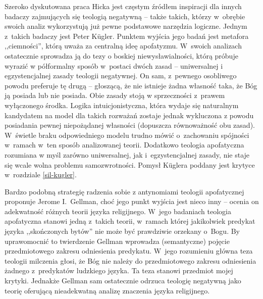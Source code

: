 Szeroko dyskutowana praca Hicka jest częstym źródłem inspiracji dla innych badaczy zajmujących się teologią negatywną -- także takich, którzy w~obrębie swoich analiz wykorzystują już pewne podstawowe narzędzia logiczne. Jednym z~takich badaczy jest Peter Kügler.
Punktem wyjścia jego badań jest metafora ,,ciemności'', którą uważa za centralną ideę apofatyzmu. W~swoich analizach ostatecznie sprowadza ją do tezy o boskiej niewysławialności, którą próbuje wyrazić w półformalny sposób w~postaci dwóch zasad -- uniwersalnej i egzystencjalnej zasady teologii negatywnej. On sam, z~pewnego osobliwego powodu preferuje tę drugą -- głoszącą, że nie istnieje żadna własność
taka, że Bóg ją posiada lub nie posiada.
Obie zasady stoją w sprzeczności z~prawem wyłączonego środka. Logika intuicjonistyczna, która wydaje się naturalnym kandydatem na model dla takich rozważań zostaje jednak wykluczona z powodu posiadania pewnej niepożądanej własności (dopuszcza równoważność obu zasad). W~świetle braku odpowiedniego modelu trudno mówić o~zachowaniu spójności w~ramach w~ten sposób analizowanej teorii. Dodatkowo teologia apofatyczna rozumiana w myśl zarówno uniwersalnej, jak i~egzystencjalnej zasady, nie staje się wcale wolna problemu samozwrotności.
Pomysł Küglera poddany jest krytyce w~rozdziale \ref{sil-kugler}.

Bardzo podobną strategię radzenia sobie z antynomiami teologii apofatycznej proponuje Jerome I.~Gellman, choć jego punkt wyjścia jest nieco inny -- 
ocenia on adekwatność różnych teorii języka religijnego. W~jego badaniach teologia apofatyczna stanowi jedną z~takich teorii, w~ramach której jakikolwiek predykat języka ,,skończonych bytów'' nie może być prawdziwie orzekany o~Bogu. By uprawomocnić to twierdzenie Gellman wprowadza (semantyczne) pojęcie przedmiotowego zakresu odniesienia predykatu. W~jego rozumieniu główna teza teologii milczenia głosi, że Bóg nie należy do przedmiotowego zakresu odniesienia żadnego z~predykatów ludzkiego języka. Ta teza stanowi przedmiot mojej krytyki. Jednakże Gellman sam ostatecznie odrzuca teologię negatywną jako teorię oferującą nieadekwatną analizę znaczenia języka religijnego.

